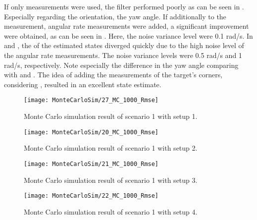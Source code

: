 If only \abbrROI measurements were used, the filter performed poorly as can be seen in .
Especially regarding the orientation, \ie the yaw angle.
If additionally to the \abbrROI measurement, angular rate measurements were added, a significant improvement were obtained, as can be seen in .
Here, the noise variance level were 0.1 rad/s.
In  and , the \abbrRMSE of the estimated states diverged quickly due to the high noise level of the angular rate measurements.
The noise variance levels were 0.5 rad/s and 1 rad/s, respectively.
Note especially the difference in the yaw angle comparing  with  and .
The idea of adding the measurements of the target's corners, considering , resulted in an excellent state estimate.

\begin{figure}[!ht]
	\centering
	\texttt{[image: MonteCarloSim/27\_MC\_1000\_Rmse]}
	\caption{\label{fig:27montesimstraighttowardsroirmse} Monte Carlo simulation result of scenario 1 with setup 1.}
\end{figure}

\begin{figure}[!ht]
	\centering
	\texttt{[image: MonteCarloSim/20\_MC\_1000\_Rmse]}
	\caption{\label{fig:20montesimstraighttowardsroiangvelrmse} Monte Carlo simulation result of scenario 1 with setup 2.}
\end{figure}

\begin{figure}[!ht]
	\centering
	\texttt{[image: MonteCarloSim/21\_MC\_1000\_Rmse]}
	\caption{\label{fig:21montesimstraighttowardsroiangvelrmse} Monte Carlo simulation result of scenario 1 with setup 3.}
\end{figure}

\begin{figure}[!ht]
	\centering
	\texttt{[image: MonteCarloSim/22\_MC\_1000\_Rmse]}
	\caption{\label{fig:22montesimstraighttowardsroiangvelrmse} Monte Carlo simulation result of scenario 1 with setup 4.}
\end{figure}

